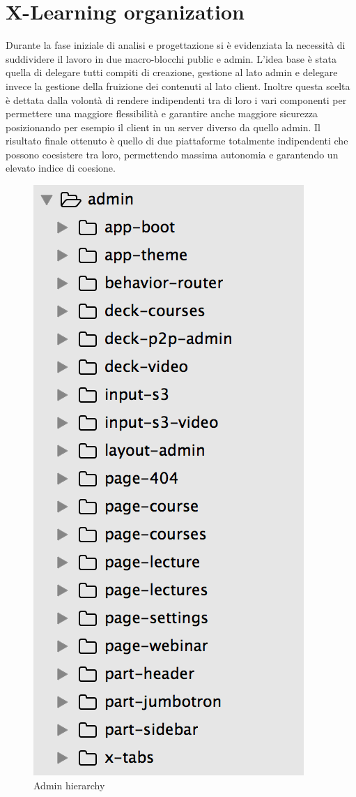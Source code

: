 \section{X-Learning organization}
\label{sec:x-learning_organization}

  Durante la fase iniziale di analisi e progettazione si è evidenziata la necessità di suddividere il lavoro in due macro-blocchi public e admin. L’idea base è stata quella di delegare tutti compiti di creazione, gestione al lato admin e delegare invece la gestione della fruizione dei contenuti al lato client.
Inoltre questa scelta è dettata dalla volontà di rendere indipendenti tra di loro i vari componenti per permettere una maggiore flessibilità e garantire anche maggiore sicurezza posizionando per esempio il client in un server diverso da quello admin.
Il risultato finale ottenuto è quello di due piattaforme totalmente indipendenti che possono coesistere tra loro, permettendo massima autonomia e garantendo un elevato indice di coesione.


\begin{figure}[htbp] %
 \centering
 \includegraphics[width=0.5\linewidth]{images/chapter3/admin.png}\hfill
 \caption[admin hierarchy]{Admin hierarchy}
 \label{fig:fourV}
\end{figure}

